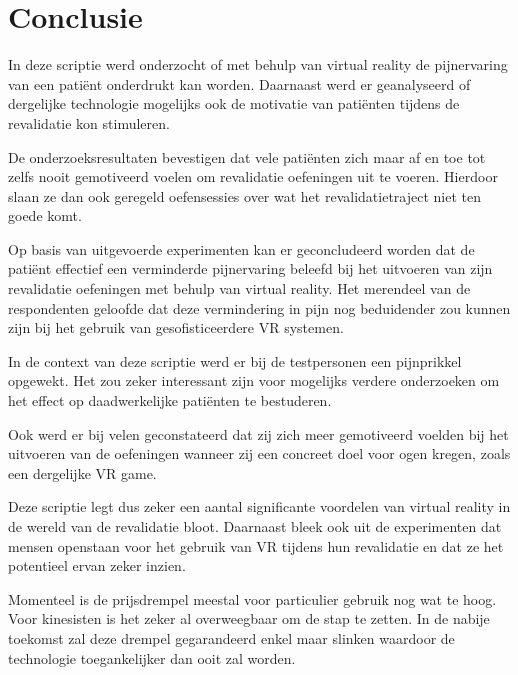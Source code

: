 
\chapter{Conclusie}
\label{ch:conclusie}


In deze scriptie werd onderzocht of met behulp van virtual reality de pijnervaring van een patiënt onderdrukt kan worden. Daarnaast werd er geanalyseerd of dergelijke technologie mogelijks ook de motivatie van patiënten tijdens de revalidatie kon stimuleren.

De onderzoeksresultaten bevestigen dat vele patiënten zich maar af en toe tot zelfs nooit gemotiveerd voelen om revalidatie oefeningen uit te voeren. Hierdoor slaan ze dan ook geregeld oefensessies over wat het revalidatietraject niet ten goede komt.

Op basis van uitgevoerde experimenten kan er geconcludeerd worden dat de patiënt effectief een verminderde pijnervaring beleefd bij het uitvoeren van zijn revalidatie oefeningen met behulp van virtual reality. Het merendeel van de respondenten geloofde dat deze vermindering in pijn nog beduidender zou kunnen zijn bij het gebruik van gesofisticeerdere VR systemen.

In de context van deze scriptie werd er bij de testpersonen een pijnprikkel opgewekt. Het zou zeker interessant zijn voor mogelijks verdere onderzoeken om het effect op daadwerkelijke patiënten te bestuderen.

Ook werd er bij velen geconstateerd dat zij zich meer gemotiveerd voelden bij het uitvoeren van de oefeningen wanneer zij een concreet doel voor ogen kregen, zoals een dergelijke VR game.

Deze scriptie legt dus zeker een aantal significante voordelen van virtual reality in de wereld van de revalidatie bloot. Daarnaast bleek ook uit de experimenten dat mensen openstaan voor het gebruik van VR tijdens hun revalidatie en dat ze het potentieel ervan zeker inzien.

Momenteel is de prijsdrempel meestal voor particulier gebruik nog wat te hoog. Voor kinesisten is het zeker al overweegbaar om de stap te zetten. In de nabije toekomst zal deze drempel gegarandeerd enkel maar slinken waardoor de technologie toegankelijker dan ooit zal worden.


